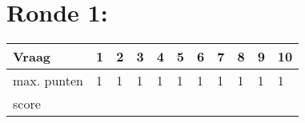 \begin{center}
\end{center}
\vspace{5mm}
 
 
\vspace{5mm}
 
\section{Ronde 1:}
\begin{questions}

\question[1] \enspace\hrulefill
\question[1] \enspace\hrulefill
\question[1] \enspace\hrulefill
\question[1] \enspace\hrulefill
\question[1] \enspace\hrulefill
\question[1] \enspace\hrulefill
\question[1] \enspace\hrulefill
\question[1] \enspace\hrulefill
\question[1] \enspace\hrulefill
\question[1] \enspace\hrulefill

\end{questions}
\begin{table}[!b]
\centering
\begin{tabular}{|l|l|l|l|l|l|l|l|l|l|l|}
\hline
Vraag       & 1 & 2 & 3 & 4 & 5 & 6 & 7 & 8 & 9 & 10 \\ \hline
max. punten & 1 & 1 & 1 & 1 & 1 & 1 & 1 & 1 & 1 & 1  \\ \hline
score       &   &   &   &   &   &   &   &   &   &    \\ \hline
\end{tabular}
\end{table}
\newpage
